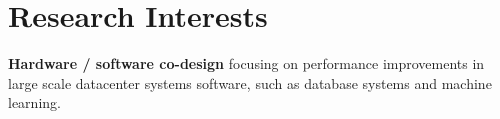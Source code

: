 \section{Research Interests}

\textbf{Hardware / software co-design} focusing on performance improvements in
large scale datacenter systems software, such as database systems and machine learning.
